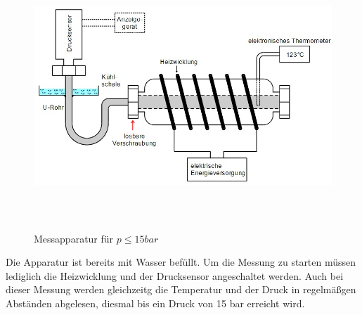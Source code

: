 \begin{figure}
  \centering
  \includegraphics[height=10cm]{aufbau2.jpg}
  \caption{Messapparatur für $p ≤ 15 bar$}
  \label{fig:aufbau2}
\end{figure}

Die Apparatur ist bereits mit Wasser befüllt. Um die Messung zu starten müssen
lediglich die Heizwicklung und der Drucksensor angeschaltet werden. Auch bei
dieser Messung werden gleichzeitg die Temperatur und der Druck in regelmäßgen
Abständen abgelesen, diesmal bis ein Druck von 15 bar erreicht wird.
